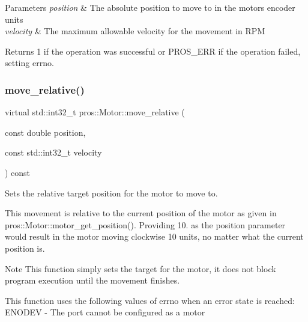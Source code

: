 \begin{DoxyParams}{Parameters}
{\em position} & The absolute position to move to in the motor\textquotesingle{}s encoder units \\
\hline
{\em velocity} & The maximum allowable velocity for the movement in R\+PM\\
\hline
\end{DoxyParams}
\begin{DoxyReturn}{Returns}
1 if the operation was successful or P\+R\+O\+S\+\_\+\+E\+RR if the operation failed, setting errno. 
\end{DoxyReturn}
\mbox{\label{classpros_1_1Motor_a96c09e169b5135d9001cec92fa2686c1}} 
\subsubsection{\texorpdfstring{move\+\_\+relative()}{move\_relative()}}
{\footnotesize\ttfamily virtual std\+::int32\+\_\+t pros\+::\+Motor\+::move\+\_\+relative (\begin{DoxyParamCaption}\item[{const double}]{position,  }\item[{const std\+::int32\+\_\+t}]{velocity }\end{DoxyParamCaption}) const\hspace{0.3cm}{\ttfamily [virtual]}}



Sets the relative target position for the motor to move to. 

This movement is relative to the current position of the motor as given in pros\+::\+Motor\+::motor\+\_\+get\+\_\+position(). Providing 10. as the position parameter would result in the motor moving clockwise 10 units, no matter what the current position is.

\begin{DoxyNote}{Note}
This function simply sets the target for the motor, it does not block program execution until the movement finishes.
\end{DoxyNote}
This function uses the following values of errno when an error state is reached\+: E\+N\+O\+D\+EV -\/ The port cannot be configured as a motor


